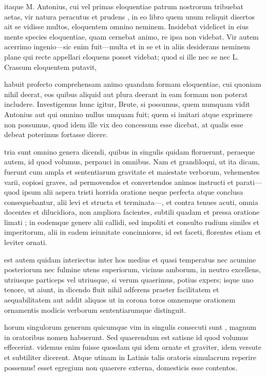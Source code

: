  itaque M. Antonius, cui vel primas eloquentiae patrum nostrorum tribuebat aetas, vir natura peracutus et prudens , in eo libro quem unum reliquit disertos ait se vidisse multos, eloquentem omnino neminem. Insidebat videlicet in eius mente species eloquentiae, quam cernebat animo, re ipsa non videbat. Vir autem acerrimo ingenio—sic enim fuit—multa et in se et in aliis desiderans neminem plane qui recte appellari eloquens posset videbat; quod si ille nec se nec L. Crassum eloquentem putavit,

 habuit profecto comprehensam animo quandam formam eloquentiae, cui quoniam nihil deerat, eos quibus aliquid aut plura deerant in eam formam non poterat includere. Investigemus hunc igitur, Brute, si possumus, quem numquam vidit Antonius aut qui omnino nullus umquam fuit; quem si imitari atque exprimere non possumus, quod idem ille vix deo concessum esse dicebat, at qualis esse debeat poterimus fortasse dicere.

 tria sunt omnino genera dicendi, quibus in singulis quidam floruerunt, peraeque autem, id quod volumus, perpauci in omnibus. Nam et grandiloqui, ut ita dicam, fuerunt cum ampla et sententiarum gravitate et maiestate verborum, vehementes varii, copiosi graves, ad permovendos et convertendos animos instructi et parati—quod ipsum alii aspera tristi horrida oratione neque perfecta atque conclusa consequebantur, alii levi et structa et terminata—, et contra tenues acuti, omnia docentes et dilucidiora, non ampliora facientes, subtili quadam et pressa oratione limati ; in eodemque genere alii callidi, sed impoliti et consulto rudium similes et imperitorum, alii in eadem ieiunitate concinniores, id est faceti, florentes etiam et leviter ornati.

 est autem quidam interiectus inter hos medius et quasi temperatus nec acumine posteriorum nec fulmine utens superiorum, vicinus amborum, in neutro excellens, utriusque particeps vel utriusque, si verum quaerimus, potius expers; isque uno tenore, ut aiunt, in dicendo fluit nihil adferens praeter facilitatem et aequabilitatem aut addit aliquos ut in corona toros omnemque orationem ornamentis modicis verborum sententiarumque distinguit.

 horum singulorum generum quicumque vim in singulis consecuti sunt , magnum in oratoribus nomen habuerunt. Sed quaerendum est satisne id quod volumus effecerint. videmus enim fuisse quosdam qui idem ornate et graviter, idem versute et subtiliter dicerent. Atque utinam in Latinis talis oratoris simulacrum reperire possemus! esset egregium non quaerere externa, domesticis esse contentos.

